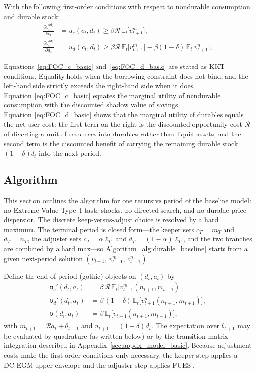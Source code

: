 With the following first-order conditions with respect to nondurable consumption and durable stock:
\begin{align}
	\frac{\partial v_t^{adj}}{\partial c_t} &= u_c(c_t, d_t) \geq \beta \mathcal{R}\, \mathbb{E}_t \big[v_{t+1}^m\big], \label{eq:FOC_c_basic} \\
	\frac{\partial v_t^{adj}}{\partial d_t} &= u_d(c_t, d_t) \geq \beta \mathcal{R}\, \mathbb{E}_t\big[v_{t+1}^m\big] - \beta (1 - \delta)\, \mathbb{E}_t\big[v_{t+1}^n\big], \label{eq:FOC_d_basic}
\end{align}

Equations~\ref{eq:FOC_c_basic} and~\ref{eq:FOC_d_basic} are stated as KKT conditions. Equality holds when the borrowing constraint does not bind, and the left-hand side strictly exceeds the right-hand side when it does. Equation~\ref{eq:FOC_c_basic} equates the marginal utility of nondurable consumption with the discounted shadow value of savings. Equation~\ref{eq:FOC_d_basic} shows that the marginal utility of durables equals the net user cost: the first term on the right is the discounted opportunity cost $\mathcal{R}$ of diverting a unit of resources into durables rather than liquid assets, and the second term is the discounted benefit of carrying the remaining durable stock $(1-\delta)d_t$ into the next period.

\subsection{Algorithm}\label{subsec:AlgorithmBasic}
This section outlines the algorithm for one recursive period of the baseline model: no Extreme Value Type~I taste shocks, no directed search, and no durable-price dispersion. The discrete keep-versus-adjust choice is resolved by a hard maximum. The terminal period is closed form---the keeper sets $c_T=m_T$ and $d_T=n_T$, the adjuster sets $c_T=\alpha\ell_T$ and $d_T=(1-\alpha)\ell_T$, and the two branches are combined by a hard max---so Algorithm~\ref{alg:durable_baseline} starts from a given next-period solution $(v_{t+1},\,v_{t+1}^{m},\,v_{t+1}^{n})$.

Define the end-of-period (gothic) objects on $(d_t,a_t)$ by
\begin{align}
	\mathfrak{v}_c'(d_t,a_t) &= \beta\,\mathcal{R}\,\mathbb{E}_t\big[v_{t+1}^{m}(n_{t+1},m_{t+1})\big],\\
	\mathfrak{v}_d'(d_t,a_t) &= \beta\,(1-\delta)\,\mathbb{E}_t\big[v_{t+1}^{n}(n_{t+1},m_{t+1})\big],\\
	\mathfrak{v}(d_t,a_t) &= \beta\,\mathbb{E}_t\big[v_{t+1}(n_{t+1},m_{t+1})\big],
\end{align}
with $m_{t+1}=\mathcal{R}a_t+\theta_{t+1}$ and $n_{t+1}=(1-\delta)d_t$. The expectation over $\theta_{t+1}$ may be evaluated by quadrature (as written below) or by the transition-matrix integration described in Appendix~\ref{sec:appdx_model_basic}. Because adjustment costs make the first-order conditions only necessary, the keeper step applies a DC-EGM upper envelope \citep{Iskhakov2017-jb} and the adjuster step applies FUES \citep{Dobrescu2022-ii}.

